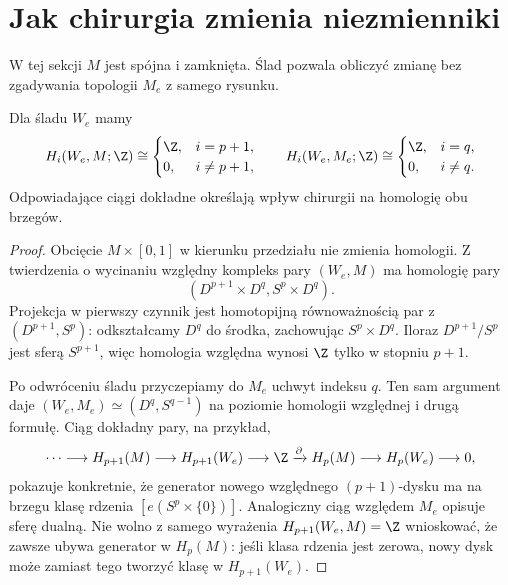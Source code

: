 \section{Jak chirurgia zmienia niezmienniki}
\label{sec:niezmienniki-chirurgia-21}

W tej sekcji $M$ jest spójna i zamknięta.
Ślad pozwala obliczyć zmianę bez zgadywania
topologii $M_e$ z samego rysunku.

\begin{twierdzenie}
\label{thm:homologia-sladu-21}
Dla śladu $W_e$ mamy
\[
 H_i(W_e,M;\Z)\cong
 \begin{cases}\Z,&i=p+1,\\0,&i\ne p+1,
 \end{cases}
 \qquad
 H_i(W_e,M_e;\Z)\cong
 \begin{cases}\Z,&i=q,\\0,&i\ne q.
 \end{cases}
\]
Odpowiadające ciągi dokładne określają wpływ
chirurgii na homologię obu brzegów.
\end{twierdzenie}
\begin{proof}
Obcięcie $M\times[0,1]$ w kierunku przedziału
nie zmienia homologii. Z twierdzenia o wycinaniu
względny kompleks pary $(W_e,M)$ ma homologię
pary
\[
 (D^{p+1}\times D^q,S^p\times D^q).
\]
Projekcja w pierwszy czynnik jest homotopijną
równoważnością par z $(D^{p+1},S^p)$:
odkształcamy $D^q$ do środka, zachowując
$S^p\times D^q$. Iloraz $D^{p+1}/S^p$
jest sferą $S^{p+1}$, więc homologia względna
wynosi $\Z$ tylko w stopniu $p+1$.

Po odwróceniu śladu przyczepiamy do $M_e$
uchwyt indeksu $q$. Ten sam argument daje
$(W_e,M_e)\simeq(D^q,S^{q-1})$ na poziomie
homologii względnej i drugą formułę.
Ciąg dokładny pary, na przykład,
\[
 \cdots\longrightarrow H_{p+1}(M)
 \longrightarrow H_{p+1}(W_e)
 \longrightarrow\Z\xrightarrow{\partial}
 H_p(M)\longrightarrow H_p(W_e)
 \longrightarrow0,
\]
pokazuje konkretnie, że generator nowego
względnego $(p+1)$-dysku ma na brzegu klasę
rdzenia $[e(S^p\times\{0\})]$.
Analogiczny ciąg względem $M_e$ opisuje
sferę dualną. Nie wolno z samego wyrażenia
$H_{p+1}(W_e,M)=\Z$ wnioskować, że zawsze
ubywa generator w $H_p(M)$: jeśli klasa rdzenia
jest zerowa, nowy dysk może zamiast tego
tworzyć klasę w $H_{p+1}(W_e)$.
\end{proof}

